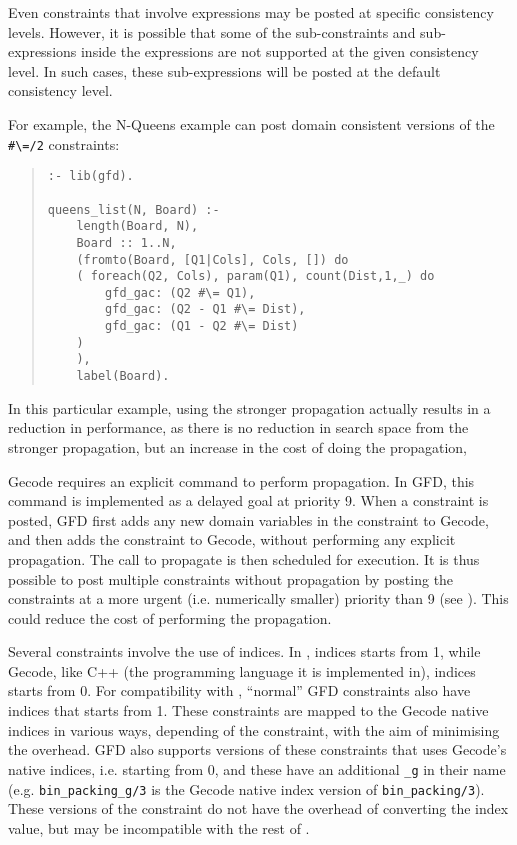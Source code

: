 Even constraints that involve expressions may be posted at specific 
consistency levels. However, it is possible that some of
the sub-constraints and sub-expressions inside the expressions are not supported
at the given consistency level. In such cases, these sub-expressions will be
posted at the default consistency level.

For example, the N-Queens example
can post domain consistent versions of the \verb'#\=/2' constraints:
\begin{quote}
\begin{verbatim}
:- lib(gfd).

queens_list(N, Board) :-
    length(Board, N),
    Board :: 1..N,
    (fromto(Board, [Q1|Cols], Cols, []) do
	( foreach(Q2, Cols), param(Q1), count(Dist,1,_) do
	    gfd_gac: (Q2 #\= Q1),
	    gfd_gac: (Q2 - Q1 #\= Dist),
	    gfd_gac: (Q1 - Q2 #\= Dist)
	)
    ),
    label(Board).
\end{verbatim}
\end{quote}
In this particular example, using the stronger propagation actually results in
a reduction in performance, as there is no reduction in search space from the
stronger propagation, but an increase in the cost of doing the propagation, 


Gecode requires an explicit command to perform propagation. In GFD,
this command is implemented as a delayed goal at priority 9.
When a constraint is posted, GFD first adds any new domain variables in
 the constraint to Gecode, and then adds the constraint to Gecode,
 without performing any explicit propagation. The call to propagate is
then scheduled for execution. It is thus possible to post multiple
 constraints without propagation by posting the constraints at a more
urgent (i.e. numerically smaller) priority than 9 (see
).
This could reduce the cost of performing the propagation.
 
Several constraints involve the use of indices. In \eclipse, indices starts
from 1, while Gecode, like C++ (the programming language it is implemented in), indices starts from 0. For compatibility 
with \eclipse, ``normal'' GFD constraints also have indices
that starts from 1. These constraints are mapped to the Gecode native 
indices in various ways, depending of the constraint, with the aim of 
minimising the overhead. GFD also supports versions of these constraints that 
uses Gecode's native indices, i.e. starting from 0, and these have an 
additional {\tt _g} in their name (e.g. {\tt bin_packing_g/3} is the Gecode native
index version of {\tt bin_packing/3}). These versions of the constraint do not
have the overhead of converting the index value, but may be
incompatible with the rest of \eclipse.

